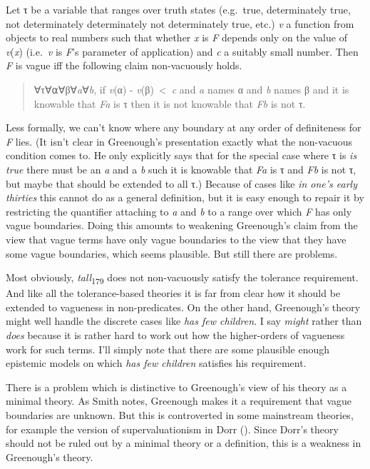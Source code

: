 \documentclass[
  10pt,
  letterpaper,
  DIV=11,
  numbers=noendperiod,
  twoside]{scrartcl}
\begin{document}
Let τ be a variable that ranges over truth states (e.g.~true,
determinately true, not determinately determinately not determinately
true, etc.) \emph{v} a function from objects to real numbers such that
whether \emph{x} is \emph{F} depends only on the value of
\emph{v}(\emph{x}) (i.e.~\emph{v} is \emph{F}'s parameter of
application) and \emph{c} a suitably small number. Then \emph{F} is
vague iff the following claim non-vacuously holds.

\begin{quote}
∀τ∀⍺∀β∀\emph{a}∀\emph{b}, if \emph{v}(α) -
\emph{v}(β)~\textless~\emph{c} and \emph{a} names α and \emph{b} names β
and it is knowable that \emph{Fa} is τ then it is not knowable that
\emph{Fb} is not τ.
\end{quote}

Less formally, we can't know where any boundary at any order of
definiteness for \emph{F} lies. (It isn't clear in Greenough's
presentation exactly what the non-vacuous condition comes to. He only
explicitly says that for the special case where τ is \emph{is true}
there must be an \emph{a} and a \emph{b} such it is knowable that
\emph{Fa} is τ and \emph{Fb} is not τ, but maybe that should be extended
to all τ.) Because of cases like \emph{in one's early thirties} this
cannot do as a general definition, but it is easy enough to repair it by
restricting the quantifier attaching to \emph{a} and \emph{b} to a range
over which \emph{F} has only vague boundaries. Doing this amounts to
weakening Greenough's claim from the view that vague terms have only
vague boundaries to the view that they have some vague boundaries, which
seems plausible. But still there are problems.

Most obviously, \emph{tall}\textsubscript{179} does not non-vacuously
satisfy the tolerance requirement. And like all the tolerance-based
theories it is far from clear how it should be extended to vagueness in
non-predicates. On the other hand, Greenough's theory might well handle
the discrete cases like \emph{has few children}. I say \emph{might}
rather than \emph{does} because it is rather hard to work out how the
higher-orders of vagueness work for such terms. I'll simply note that
there are some plausible enough epistemic models on which \emph{has few
children} satisfies his requirement.

There is a problem which is distinctive to Greenough's view of his
theory as a minimal theory. As Smith notes, Greenough makes it a
requirement that vague boundaries are unknown. But this is controverted
in some mainstream theories, for example the version of
supervaluationism in Dorr (). Since Dorr's
theory should not be ruled out by a minimal theory or a definition, this
is a weakness in Greenough's theory.
\end{document}
